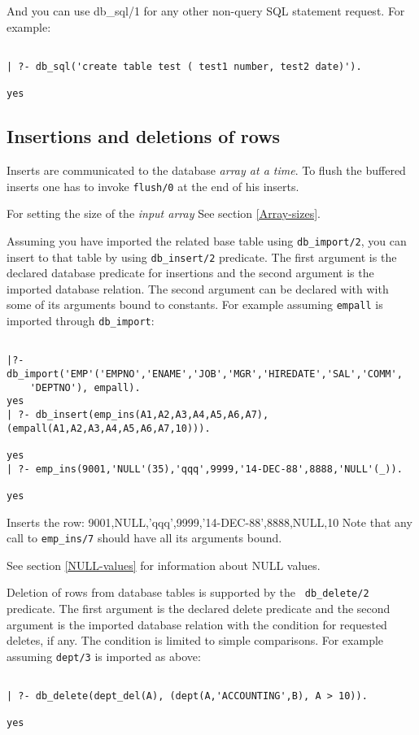 And you can use db\_sql/1 for any other non-query SQL statement request.  For 
example:
\begin{verbatim}

| ?- db_sql('create table test ( test1 number, test2 date)').

yes
\end{verbatim}

\subsection{Insertions and deletions of rows}

Inserts are communicated to the database {\it array at a time}.
To flush the buffered inserts one has to invoke {\tt flush/0}
at the end of his inserts. 

For setting the size of the {\it input array} See section \ref{Array-sizes}.

Assuming you have imported the related base table using {\tt db\_import/2}, you can insert to
that table by using {\tt db\_insert/2} predicate.  The first argument is
the declared database predicate for insertions and the second argument
is the imported database relation.  The second argument can be declared with
with some of its arguments bound to constants.  For example assuming {\tt empall} is imported through {\tt db\_import}:
\begin{verbatim}

|?- db_import('EMP'('EMPNO','ENAME','JOB','MGR','HIREDATE','SAL','COMM',
	'DEPTNO'), empall).
yes 
| ?- db_insert(emp_ins(A1,A2,A3,A4,A5,A6,A7),(empall(A1,A2,A3,A4,A5,A6,A7,10))).

yes
| ?- emp_ins(9001,'NULL'(35),'qqq',9999,'14-DEC-88',8888,'NULL'(_)).

yes
\end{verbatim}
Inserts the row: 9001,NULL,'qqq',9999,'14-DEC-88',8888,NULL,10
Note that any call to {\tt emp\_ins/7} should have all its arguments bound.

See section \ref{NULL-values} for information about NULL values.

Deletion of rows from database tables is supported by the {\tt
db\_delete/2} predicate.  The first argument is the declared delete
predicate and the second argument is the imported database relation
with the condition for requested deletes, if any.  The condition is
limited to simple comparisons.  For example assuming
{\tt dept/3} is imported as above:
\begin{verbatim}

| ?- db_delete(dept_del(A), (dept(A,'ACCOUNTING',B), A > 10)). 

yes
\end{verbatim}

